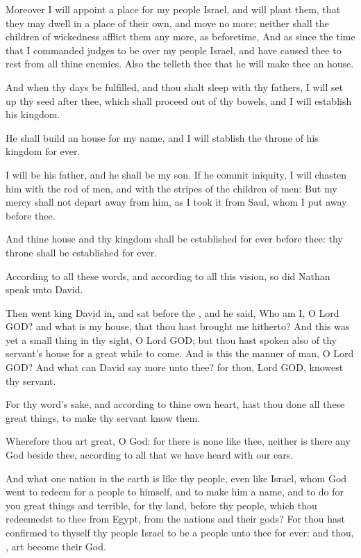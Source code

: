 \verse Moreover I will appoint a place for my people Israel, and will plant them, that they may dwell in a place of their own, and move no more; neither shall the children of wickedness afflict them any more, as beforetime, \verse And as since the time that I commanded judges to be over my people Israel, and have caused thee to rest from all thine enemies. Also the \LORD telleth thee that he will make thee an house.

\verse And when thy days be fulfilled, and thou shalt sleep with thy fathers, I will set up thy seed after thee, which shall proceed out of thy bowels, and I will establish his kingdom.

\verse He shall build an house for my name, and I will stablish the throne of his kingdom for ever.

\verse I will be his father, and he shall be my son. If he commit iniquity, I will chasten him with the rod of men, and with the stripes of the children of men: \verse But my mercy shall not depart away from him, as I took it from Saul, whom I put away before thee.

\verse And thine house and thy kingdom shall be established for ever before thee: thy throne shall be established for ever.

\verse According to all these words, and according to all this vision, so did Nathan speak unto David.

\verse Then went king David in, and sat before the \LORD, and he said, Who am I, O Lord GOD? and what is my house, that thou hast brought me hitherto?  \verse And this was yet a small thing in thy sight, O Lord GOD; but thou hast spoken also of thy servant's house for a great while to come. And is this the manner of man, O Lord GOD?  \verse And what can David say more unto thee? for thou, Lord GOD, knowest thy servant.

\verse For thy word's sake, and according to thine own heart, hast thou done all these great things, to make thy servant know them.

\verse Wherefore thou art great, O \LORD God: for there is none like thee, neither is there any God beside thee, according to all that we have heard with our ears.

\verse And what one nation in the earth is like thy people, even like Israel, whom God went to redeem for a people to himself, and to make him a name, and to do for you great things and terrible, for thy land, before thy people, which thou redeemedst to thee from Egypt, from the nations and their gods?  \verse For thou hast confirmed to thyself thy people Israel to be a people unto thee for ever: and thou, \LORD, art become their God.

